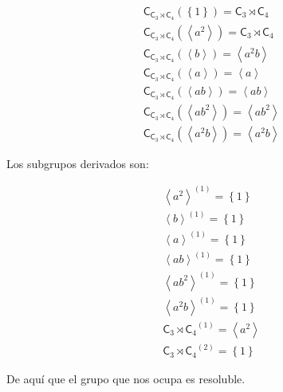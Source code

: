\documentclass[12pt,a4paper,fleqn,spanish,final,openright]{extbook}
\theoremstyle{definition}
\theoremstyle{remark}
\begin{document}
\begin{align*}
&{\mathsf{C}_{{{{\mathsf{C}}_{3}}\rtimes{{\mathsf{C}}_{4}}}}}
\left({\left\lbrace{1}\right\rbrace}\right) =
{{{\mathsf{C}}_{3}}\rtimes{{\mathsf{C}}_{4}}}\\
&{\mathsf{C}_{{{{\mathsf{C}}_{3}}\rtimes{{\mathsf{C}}_{4}}}}}
\left({\left\langle{a^2}\right\rangle}\right) =
{{{\mathsf{C}}_{3}}\rtimes{{\mathsf{C}}_{4}}}\\
&{\mathsf{C}_{{{{\mathsf{C}}_{3}}\rtimes{{\mathsf{C}}_{4}}}}}
\left({\left\langle{b}\right\rangle}\right) =
{\left\langle{a^2b}\right\rangle}\\
&{\mathsf{C}_{{{{\mathsf{C}}_{3}}\rtimes{{\mathsf{C}}_{4}}}}}
\left({\left\langle{a}\right\rangle}\right) =
{\left\langle{a}\right\rangle}\\
&{\mathsf{C}_{{{{\mathsf{C}}_{3}}\rtimes{{\mathsf{C}}_{4}}}}}
\left({\left\langle{ab}\right\rangle}\right) =
{\left\langle{ab}\right\rangle}\\
&{\mathsf{C}_{{{{\mathsf{C}}_{3}}\rtimes{{\mathsf{C}}_{4}}}}}
\left({\left\langle{ab^2}\right\rangle}\right) =
{\left\langle{ab^2}\right\rangle}\\
&{\mathsf{C}_{{{{\mathsf{C}}_{3}}\rtimes{{\mathsf{C}}_{4}}}}}
\left({\left\langle{a^2b}\right\rangle}\right) =
{\left\langle{a^2b}\right\rangle}
\end{align*}

Los subgrupos derivados son:

\begin{align*}
&{\left\langle{a^2}\right\rangle}^{(1)} = {\left\lbrace{1}\right\rbrace}\\
&{\left\langle{b}\right\rangle}^{(1)} = {\left\lbrace{1}\right\rbrace}\\
&{\left\langle{a}\right\rangle}^{(1)} = {\left\lbrace{1}\right\rbrace}\\
&{\left\langle{ab}\right\rangle}^{(1)} = {\left\lbrace{1}\right\rbrace}\\
&{\left\langle{ab^2}\right\rangle}^{(1)} = {\left\lbrace{1}\right\rbrace}\\
&{\left\langle{a^2b}\right\rangle}^{(1)} = {\left\lbrace{1}\right\rbrace}\\
&{{{\mathsf{C}}_{3}}\rtimes{{\mathsf{C}}_{4}}}^{(1)} ={\left\langle{a^2}\right\rangle}\\
&{{{\mathsf{C}}_{3}}\rtimes{{\mathsf{C}}_{4}}}^{(2)} ={\left\lbrace{1}\right\rbrace}
\end{align*}

De aquí que el grupo que nos ocupa es resoluble.
\end{document}
